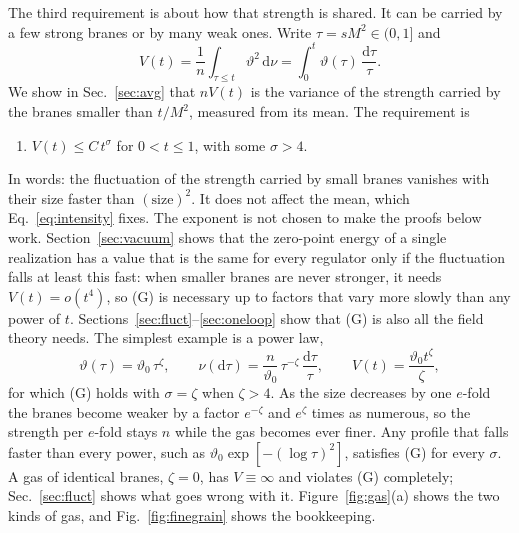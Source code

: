 \documentclass[a4paper,11pt]{article}
\newcommand{\dd}{\mathrm{d}}
\begin{document}
The third requirement is about how that strength is shared. It can be carried by a few strong branes or by many weak ones. Write $\tau=sM^2\in(0,1]$ and
\begin{equation}
\label{eq:V}
V(t)=\frac1n\int_{\tau\le t}\vartheta^2\,\dd\nu=\int_0^t\vartheta(\tau)\,\frac{\dd\tau}\tau .
\end{equation}
We show in Sec.~\ref{sec:avg} that $nV(t)$ is the variance of the strength carried by the branes smaller than $t/M^2$, measured from its mean. The requirement is
\begin{enumerate}[label=\textup{(G)},leftmargin=2.4em,itemsep=0.15em]
\item $V(t)\le C\,t^{\sigma}$ for $0<t\le1$, with some $\sigma>4$.
\end{enumerate}
In words: the fluctuation of the strength carried by small branes vanishes with their size faster than $(\text{size})^{2}$. It does not affect the mean, which Eq.~\eqref{eq:intensity} fixes. The exponent is not chosen to make the proofs below work. Section~\ref{sec:vacuum} shows that the zero-point energy of a single realization has a value that is the same for every regulator only if the fluctuation falls at least this fast: when smaller branes are never stronger, it needs $V(t)=o(t^4)$, so (G) is necessary up to factors that vary more slowly than any power of $t$. Sections~\ref{sec:fluct}--\ref{sec:oneloop} show that (G) is also all the field theory needs. The simplest example is a power law,
\begin{equation}
\label{eq:finegrain}
\vartheta(\tau)=\vartheta_0\,\tau^{\zeta},\qquad\nu(\dd\tau)=\frac n{\vartheta_0}\,\tau^{-\zeta}\,\frac{\dd\tau}\tau,\qquad V(t)=\frac{\vartheta_0t^{\zeta}}\zeta ,
\end{equation}
for which (G) holds with $\sigma=\zeta$ when $\zeta>4$. As the size decreases by one $e$-fold the branes become weaker by a factor $e^{-\zeta}$ and $e^{\zeta}$ times as numerous, so the strength per $e$-fold stays $n$ while the gas becomes ever finer. Any profile that falls faster than every power, such as $\vartheta_0\exp[-(\log\tau)^2]$, satisfies (G) for every $\sigma$. A gas of identical branes, $\zeta=0$, has $V\equiv\infty$ and violates (G) completely; Sec.~\ref{sec:fluct} shows what goes wrong with it. Figure~\ref{fig:gas}(a) shows the two kinds of gas, and Fig.~\ref{fig:finegrain} shows the bookkeeping.
\end{document}
